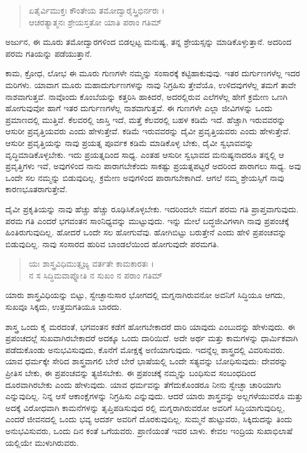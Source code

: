 \begin{verse}
ಏತೈರ್ವಿಮುಕ್ತಃ ಕೌಂತೇಯ ತಮೋದ್ವಾರೈಸ್ತ್ರಿಭಿರ್ನರಃ ।\\ಆಚರತ್ಯಾತ್ಮನಃ ಶ್ರೇಯಸ್ತತೋ ಯಾತಿ ಪರಾಂ ಗತಿಮ್ 
\end{verse}

{\small ಅರ್ಜುನ, ಈ ಮೂರು ತಮೋದ್ವಾರಗಳಿಂದ ಬಿಡಲ್ಪಟ್ಟ ಮನುಷ್ಯ, ತನ್ನ ಶ್ರೇಯಸ್ಸನ್ನು ಮಾಡಿಕೊಳ್ಳುತ್ತಾನೆ. ಅದರಿಂದ ಪರಮ ಗತಿಯನ್ನು ಪಡೆಯುತ್ತಾನೆ.}

ಕಾಮ, ಕ್ರೋಧ, ಲೋಭ ಈ ಮೂರು ಗುಣಗಳೇ ನಮ್ಮನ್ನು ಸಂಸಾರಕ್ಕೆ ಕಟ್ಟಿಹಾಕುವುವು. ಇತರ ದುರ್ಗುಣಗಳೆಲ್ಲ ಇದರ ಮರಿಗಳು. ಯಾವಾಗ ಮೂರು ಮಹಾದುರ್ಗುಣಗಳನ್ನು ನಾವು ನಿಗ್ರಹಿಸು ತ್ತೇವೆಯೊ, ಉಳಿದವುಗಳೆಲ್ಲ ತಮಗೆ ತಾವೇ ನಾಶವಾಗುತ್ತವೆ. ನಾವೊಂದು ಕೊಂಬೆಯನ್ನು ಕತ್ತರಿಸಿ ಹಾಕಿದರೆ, ಅದರಲ್ಲಿರುವ ಎಲೆಗಳೆಲ್ಲ ಹೇಗೆ ಕ್ರಮೇಣ ಒಣಗಿ ಹೋಗುವುವೋ ಹಾಗೆ ಇತರ ದುರ್ಗುಣಗಳೆಲ್ಲ ನಾಶವಾಗುತ್ತವೆ. ಈ ಗುಣಗಳೇ ಎಲ್ಲಾ ಜೀವಿಗಳನ್ನು ಒಂದು ಪ್ರಮಾಣದಲ್ಲಿ ಮುತ್ತಿವೆ. ಕೆಲವರಲ್ಲಿ ಜಾಸ್ತಿ ಇದೆ, ಮತ್ತೆ ಕೆಲವರಲ್ಲಿ ಬಹಳ ಕಡಿಮೆ ಇದೆ. ಹೆಚ್ಚಾಗಿ ಇರುವವರನ್ನು ಆಸುರೀ ಪ್ರವೃತ್ತಿಯವರು ಎಂದು ಹೇಳುತ್ತೇವೆ. ಕಡಿಮೆ ಇರುವವರನ್ನು ದೈವೀ ಪ್ರವೃತ್ತಿಯವರು ಎಂದು ಹೇಳುತ್ತೇವೆ. ಆಸುರೀ ಪ್ರವೃತ್ತಿಯನ್ನು ನಾವು ಪ್ರಯತ್ನ ಪೂರ್ವಕ ಕಡಿಮೆ ಮಾಡಿಕೊಳ್ಳ ಬೇಕು, ದೈವೀ ಸ್ವಭಾವವನ್ನು ವೃದ್ಧಿಮಾಡಿಕೊಳ್ಳಬೇಕು. ಇದು ಪ್ರಯತ್ನದಿಂದ ಸಾಧ್ಯ. ಎಂತಹ ಆಸುರೀ ಸ್ವಭಾವದ ಮನುಷ್ಯನಾದರೂ ತನ್ನಲ್ಲಿ ಆ ಪ್ರವೃತ್ತಿಗಳು ಇವೆ, ಅವುಗಳಿಂದ ನಾನು ಪಾರಾಗಬೇಕೆಂದು ಸಾಕಷ್ಟು ಪ್ರಯತ್ನಪಟ್ಟರೆ ಅದರಿಂದ ಪಾರಾಗಲು ಸಾಧ್ಯ. ಅವು ಒಂದೇ ಸಲ ನಮ್ಮನ್ನು ಬಿಡುವುದಿಲ್ಲ. ಕ್ರಮೇಣ ಅವುಗಳಿಂದ ಪಾರಾಗಬೇಕಾಗಿದೆ. ಆಗಲೆ ನಮ್ಮ ಶ್ರೇಯಸ್ಸಿಗೆ ನಾವು ಕಾರಣಭೂತರಾಗುತ್ತೇವೆ.

ದೈವೀ ಪ್ರಕೃತಿಯನ್ನು ನಾವು ಹೆಚ್ಚು ಹೆಚ್ಚು ರೂಢಿಸಿಕೊಳ್ಳಬೇಕು. ಇದರಿಂದಲೇ ನಮಗೆ ಪರಮ ಗತಿ ಪ್ರಾಪ್ತವಾಗುವುದು. ಪರಮ ಗತಿ ಎಂದರೆ ಭಗವಂತನ ಸಾಂನಿಧ್ಯವನ್ನು ಮುಟ್ಟುವುದು. ಇನ್ನು ಮೇಲೆ ಬದ್ಧಜೀವಿಗಳಾಗಿ ನಾವು ಪ್ರಪಂಚಕ್ಕೆ ಹಿಂತಿರುಗುವುದಿಲ್ಲ. ಹೋದರೆ ಒಂದೇ ಸಲ ಹೋಗುವೆವು. ಹೋಗಿಬಿಟ್ಟು ಬರುತ್ತೇನೆ ಎಂದು ಹೇಳಿ ಪ್ರಪಂಚವನ್ನು ಬಿಡುವುದಿಲ್ಲ. ನಾವು ಸಂಸಾರದ ಹುರಿವ ಬಾಂಡಲೆಯಿಂದ ಹೋಗುವುದೇ ಪರಮಗತಿ.

\begin{verse}
ಯಃ ಶಾಸ್ತ್ರವಿಧಿಮುತ್ಸೃಜ್ಯ ವರ್ತತೇ ಕಾಮಕಾರತಃ ।\\ನ ಸ ಸಿದ್ಧಿಮವಾಪ್ನೋತಿ ನ ಸುಖಂ ನ ಪರಾಂ ಗತಿಮ್ 
\end{verse}

{\small ಯಾರು ಶಾಸ್ತ್ರವಿಧಿಯನ್ನು ಬಿಟ್ಟು, ಸ್ವೇಚ್ಛಾನುಸಾರ ಭೋಗದಲ್ಲಿ ಮಗ್ನನಾಗಿರುವನೋ ಅವನಿಗೆ ಸಿದ್ಧಿಯೂ ಆಗದು, ಸುಖವೂ ಸಿಕ್ಕದು, ಉತ್ತಮಗತಿಯೂ ಬಾರದು.}

ಶಾಸ್ತ್ರ ಒಂದು ಕೈ ಮರದಂತೆ, ಭಗವಂತನ ಕಡೆಗೆ ಹೋಗಬೇಕಾದರೆ ದಾರಿ ಯಾವುದು ಎಂಬುದನ್ನು ಹೇಳುವುದು. ಈ ಪ್ರಪಂಚದಲ್ಲೆ ಸುಖವಾಗಿರಬೇಕಾದರೆ ಅದಕ್ಕೂ ಒಂದು ದಾರಿಯಿದೆ. ಅದೇ ಅರ್ಥ ಮತ್ತು ಕಾಮಗಳನ್ನು ಧಾರ್ಮಿಕವಾಗಿ ಪಡೆದುಕೊಂಡು ಅನುಭವಿಸುವುದು, ಕೊನೆಗೆ ಮೋಕ್ಷಕ್ಕೆ ಅಣಿಯಾಗುವುದು. ಇದನ್ನೆಲ್ಲ ಶಾಸ್ತ್ರದಲ್ಲಿ ವಿವರಿಸುವರು. ಯಾವ ಧರ್ಮಕ್ಕೇ ಸೇರಿದ ಶಾಸ್ತ್ರವಾಗಲಿ ಬೇರೆ ಬೇರೆ ಭಾಷೆಯಲ್ಲಿ ಒಂದೇ ಸತ್ಯವನ್ನು ಬೋಧಿಸುವುದು: ದೇವರನ್ನು ಪ್ರೀತಿಸ ಬೇಕು, ಈ ಪ್ರಪಂಚವನ್ನು ತ್ಯಜಿಸಬೇಕು. ಈ ಪ್ರಪಂಚಕ್ಕೆ ನಮ್ಮನ್ನು ಬಂಧಿಸುವ ಸಂಬಂಧದಿಂದ ದೂರವಾಗಿರಬೇಕು ಎಂದು ಹೇಳುವುದು. ಯಾವ ಧರ್ಮವನ್ನು ತೆಗೆದುಕೊಂಡರೂ ನೀನು ಸ್ವೇಚ್ಛಾ ಚಾರಿಯಾಗು ಎನ್ನುವುದಿಲ್ಲ. ನಿನ್ನ ಆಸೆ ಆಕಾಂಕ್ಷೆಗಳನ್ನು ನಿಗ್ರಹಿಸು ಎನ್ನುವುದು. ಆದರೆ ಯಾರು ಶಾಸ್ತ್ರವನ್ನು ಅಲ್ಲಗಳೆಯುವರೊ ಮತ್ತು ಅದಕ್ಕೆ ವಿರೋಧವಾಗಿ ಕಾಮನೆಗಳನ್ನು ತೃಪ್ತಿಪಡಿಸುವುದ ರಲ್ಲಿ ಮಗ್ನರಾಗಿರುವರೋ ಅವರಿಗೆ ಸಿದ್ಧಿಯಾಗುವುದಿಲ್ಲ, ಎಂದರೆ ಜೀವನದಲ್ಲಿ ಒಂದು ಭವ್ಯ ಆದರ್ಶ ಅವರಿಗೆ ದೊರಕುವುದಿಲ್ಲ. ಸುಮ್ಮನೆ ಹುಟ್ಟುವರು, ಸಿಕ್ಕಿದುದನ್ನು ತಿಂದು ಅನುಭವಿಸುವರು, ಒಂದು ದಿನ ಕಂತೆ ಒಗೆಯವರು. ಪ್ರಾಣಿಯಂತೆ ಇವರ ಬಾಳು. ಕೇವಲ ಇಂದ್ರಿಯ ಸುಖಾಭಿಲಾಷೆ ಯಲ್ಲಿಯೇ ಮುಳುಗಿರುವರು.

